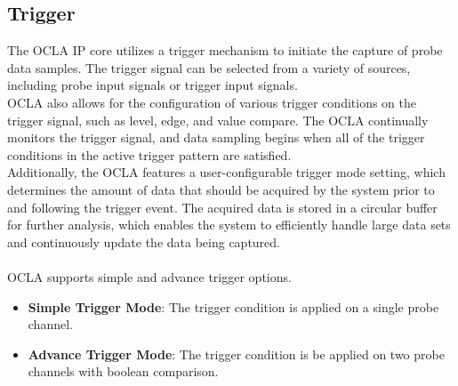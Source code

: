 \subsection*{\fontsize{14}{16}\selectfont Trigger}
The OCLA IP core utilizes a trigger mechanism to initiate the capture of probe data samples. The trigger signal can be selected from a variety of sources, including probe input signals or trigger input signals. 
\\OCLA also allows for the configuration of various trigger conditions on the trigger signal, such as level, edge, and value compare. The OCLA continually monitors the trigger signal, and data sampling begins when all of the trigger conditions in the active trigger pattern are satisfied. 
\\Additionally, the OCLA features a user-configurable trigger mode setting, which determines the amount of data that should be acquired by the system prior to and following the trigger event. The acquired data is stored in a circular buffer for further analysis, which enables the system to efficiently handle large data sets and continuously update the data being captured.
\\ \\OCLA supports simple and advance trigger options.

\begin{itemize}[noitemsep]
	\item \textbf{Simple Trigger Mode}: The trigger condition is applied on a single probe channel.
	\item \textbf{Advance Trigger Mode}: The trigger condition is be applied on two probe channels with boolean comparison. 
\end{itemize}
